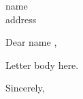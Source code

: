 \documentclass{letter}
\begin{document}

\begin{letter}{ {{ name }} \\ {{ address }} } %


\opening{Dear {{ name }}, }

Letter body here.

\closing{Sincerely,}


\end{letter}
 
\end{document}
